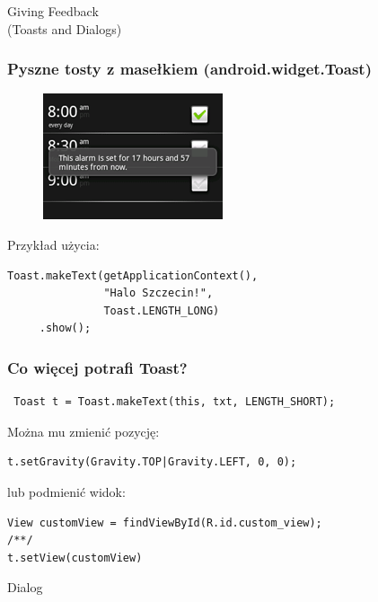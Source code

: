 \documentclass{beamer}
\begin{document}
\begin{frame}
\begin{center}
 \Huge{Giving Feedback} \\
 \large{(Toasts and Dialogs)}
\end{center}
\end{frame}


\begin{frame}[fragile]\frametitle{Pyszne tosty z masełkiem (android.widget.Toast)}

\begin{figure}[h]
 \centering
 \includegraphics[height=0.40\textheight,keepaspectratio=true]{images/toast}
\end{figure}

 Przykład użycia: 
 \begin{lstlisting}
Toast.makeText(getApplicationContext(),
               "Halo Szczecin!", 
               Toast.LENGTH_LONG)
     .show();
 \end{lstlisting}

\end{frame}

\begin{frame}[fragile]
\frametitle{Co więcej potrafi Toast?}
\begin{lstlisting}
 Toast t = Toast.makeText(this, txt, LENGTH_SHORT);
\end{lstlisting}

\pause

Można mu zmienić pozycję:
\begin{lstlisting}
t.setGravity(Gravity.TOP|Gravity.LEFT, 0, 0);
\end{lstlisting}

\pause

lub podmienić widok:
\begin{lstlisting}
View customView = findViewById(R.id.custom_view);
/**/
t.setView(customView)
 \end{lstlisting}

\end{frame}

\begin{frame}
 \begin{center}
  \Huge{Dialog}
 \end{center}
\end{frame}
\end{document}
